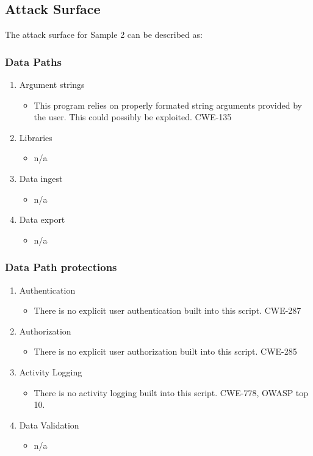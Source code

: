 \documentclass[11pt]{article}
\begin{document}
\subsection{Attack Surface}
\label{sec:org15062ac}
The attack surface for Sample 2 can be described as:
\subsubsection{Data Paths}
\label{sec:org617b583}
\begin{enumerate}
\item Argument strings
\label{sec:org1c16436}
\begin{itemize}
\item This program relies on properly formated string arguments provided by the
user.  This could possibly be exploited. CWE-135
\end{itemize}
\item Libraries
\label{sec:org47f0209}
\begin{itemize}
\item n/a
\end{itemize}
\item Data ingest
\label{sec:org565abf2}
\begin{itemize}
\item n/a
\end{itemize}
\item Data export
\label{sec:orgb4c916a}
\begin{itemize}
\item n/a
\end{itemize}
\end{enumerate}
\subsubsection{Data Path protections}
\label{sec:org7d0e0e0}
\begin{enumerate}
\item Authentication
\label{sec:orgd2a44b6}
\begin{itemize}
\item There is no explicit user authentication built into this script. CWE-287
\end{itemize}
\item Authorization
\label{sec:org1d11d52}
\begin{itemize}
\item There is no explicit user authorization built into this script. CWE-285
\end{itemize}
\item Activity Logging
\label{sec:org3a7880f}
\begin{itemize}
\item There is no activity logging built into this script. CWE-778, OWASP top 10.
\end{itemize}
\item Data Validation
\label{sec:orgdaff607}
\begin{itemize}
\item n/a
\end{itemize}
\end{enumerate}
\end{document}

